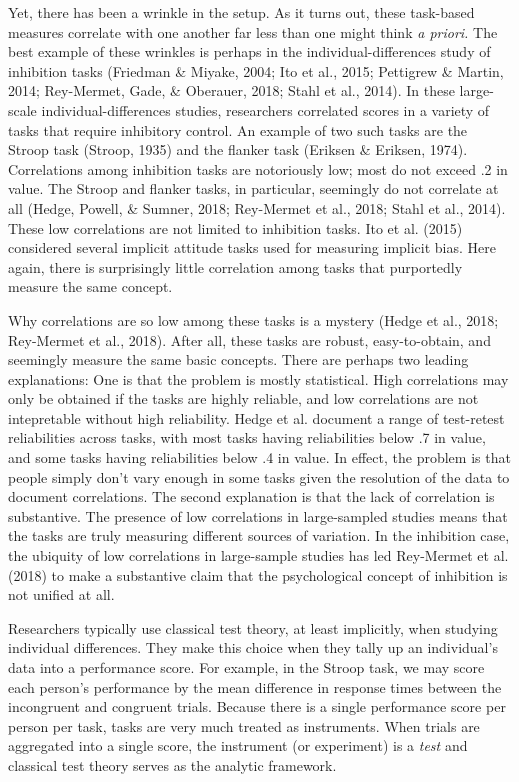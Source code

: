 \documentclass[english,man]{apa6}
\theoremstyle{definition}
\theoremstyle{definition}
\theoremstyle{remark}
\begin{document}
Yet, there has been a wrinkle in the setup. As it turns out, these
task-based measures correlate with one another far less than one might
think \emph{a priori.} The best example of these wrinkles is perhaps in
the individual-differences study of inhibition tasks (Friedman \&
Miyake, 2004; Ito et al., 2015; Pettigrew \& Martin, 2014; Rey-Mermet,
Gade, \& Oberauer, 2018; Stahl et al., 2014). In these large-scale
individual-differences studies, researchers correlated scores in a
variety of tasks that require inhibitory control. An example of two such
tasks are the Stroop task (Stroop, 1935) and the flanker task (Eriksen
\& Eriksen, 1974). Correlations among inhibition tasks are notoriously
low; most do not exceed .2 in value. The Stroop and flanker tasks, in
particular, seemingly do not correlate at all (Hedge, Powell, \& Sumner,
2018; Rey-Mermet et al., 2018; Stahl et al., 2014). These low
correlations are not limited to inhibition tasks. Ito et al. (2015)
considered several implicit attitude tasks used for measuring implicit
bias. Here again, there is surprisingly little correlation among tasks
that purportedly measure the same concept.

Why correlations are so low among these tasks is a mystery (Hedge et
al., 2018; Rey-Mermet et al., 2018). After all, these tasks are robust,
easy-to-obtain, and seemingly measure the same basic concepts. There are
perhaps two leading explanations: One is that the problem is mostly
statistical. High correlations may only be obtained if the tasks are
highly reliable, and low correlations are not intepretable without high
reliability. Hedge et al. document a range of test-retest reliabilities
across tasks, with most tasks having reliabilities below .7 in value,
and some tasks having reliabilities below .4 in value. In effect, the
problem is that people simply don't vary enough in some tasks given the
resolution of the data to document correlations. The second explanation
is that the lack of correlation is substantive. The presence of low
correlations in large-sampled studies means that the tasks are truly
measuring different sources of variation. In the inhibition case, the
ubiquity of low correlations in large-sample studies has led Rey-Mermet
et al. (2018) to make a substantive claim that the psychological concept
of inhibition is not unified at all.

Researchers typically use classical test theory, at least implicitly,
when studying individual differences. They make this choice when they
tally up an individual's data into a performance score. For example, in
the Stroop task, we may score each person's performance by the mean
difference in response times between the incongruent and congruent
trials. Because there is a single performance score per person per task,
tasks are very much treated as instruments. When trials are aggregated
into a single score, the instrument (or experiment) is a \emph{test} and
classical test theory serves as the analytic framework.
\end{document}
